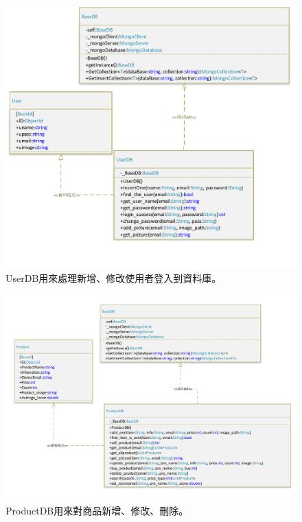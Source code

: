 \documentclass{scrreprt}
\begin{document}
\begin{CJK}{UTF8}{bkai}
\begin{figure}
	\includegraphics[width=\textwidth]{UserDB.pdf}
	\caption{UserDB用來處理新增、修改使用者登入到資料庫。}
\end{figure}

\begin{figure}
	\includegraphics[width=\textwidth]{ProductDB.pdf}
	\caption{ProductDB用來對商品新增、修改、刪除。}
\end{figure}


\end{CJK}
\end{document}
